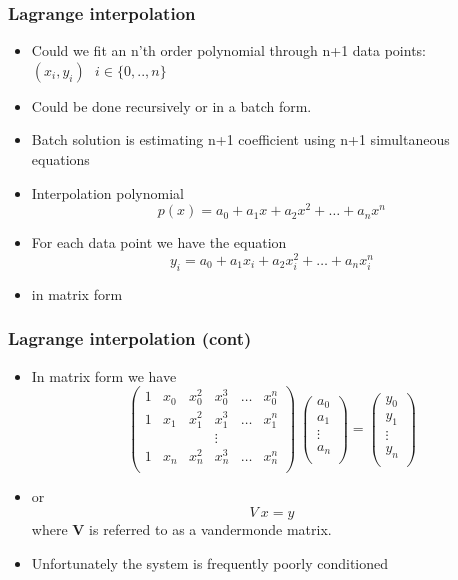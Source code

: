 \documentclass[10pt]{beamer}
\begin{document}
\begin{frame}
  \frametitle{Lagrange interpolation}
  \begin{itemize}
  \item Could we fit an n'th order polynomial through n+1 data points:  $(x_i, y_i) \mbox {   } i\in \{ 0, .., n \}$
  \item Could be done recursively or in a batch form.
  \item Batch solution is estimating n+1 coefficient using n+1 simultaneous equations
    \pause
  \item Interpolation polynomial
    \[
      p(x) = a_0 + a_1 x + a_2 x^2 + \ldots + a_n x^n
    \]
  \item For each data point we have the equation
    \[
      y_i = a_0 + a_1 x_i + a_2 x_i^2 + \ldots + a_n x_i^n
    \]
  \item in matrix form    
  \end{itemize}
\end{frame}

\begin{frame}
  \frametitle{Lagrange interpolation (cont)}
  \begin{itemize}
  \item In matrix form we have
    \[
      \left(
        \begin{array}{cccccc}
          1 & x_0 & x_0^2 & x_0^3 & \ldots & x_0^n \\
          1 & x_1 & x_1^2 & x_1^3 & \ldots & x_1^n \\
            &     &       & \vdots &       &       \\
          1 & x_n & x_n^2 & x_n^3 & \ldots & x_n^n \\
        \end{array}
      \right)
      ~
      \left(
        \begin{array}{c}
          a_0 \\ a_1 \\ \vdots \\ a_n \\
        \end{array}
      \right)
      =
      \left(
        \begin{array}{c}
          y_0 \\ y_1 \\ \vdots \\ y_n \\
        \end{array}
      \right)
    \]
  \item or
    \[ V~x = y \]
    where $\mathbf{V}$ is referred to as a vandermonde matrix.
  \item Unfortunately the system is frequently poorly conditioned      
  \end{itemize}
\end{frame}
\end{document}
